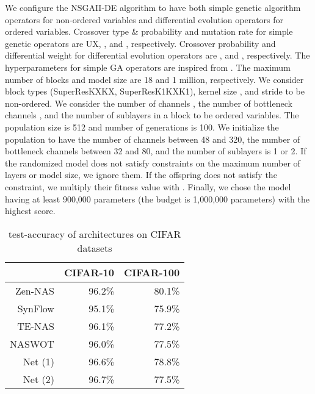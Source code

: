\documentclass[lettersize,journal]{IEEEtran}
\begin{document}
            We configure the NSGAII-DE algorithm to have both simple genetic algorithm operators for non-ordered variables and differential evolution operators for ordered variables. Crossover type \& probability and mutation rate for simple genetic operators are UX, , and , respectively. Crossover probability and differential weight for differential evolution operators are , and , respectively. The hyperparameters for simple GA operators are inspired from \cite{Genetic}. The maximum number of blocks and model size are 18 and 1 million, respectively. We consider block types (SuperResKXKX, SuperResK1KXK1), kernel size , and stride  to be non-ordered. We consider the number of channels , the number of bottleneck channels , and the number of sublayers in a block  to be ordered variables. The population size is 512 and number of generations is 100. We initialize the population to have the number of channels between 48 and 320, the number of bottleneck channels between 32 and 80, and the number of sublayers is 1 or 2. If the randomized model does not satisfy constraints on the maximum number of layers or model size, we ignore them. If the offspring does not satisfy the constraint, we multiply their fitness value with . Finally, we chose the model having at least 900,000 parameters (the budget is 1,000,000 parameters) with the highest score.

            \begin{table} 
                \caption{test-accuracy of architectures on CIFAR datasets}
                \label{tab:E2E}
                \centering
                \begin{tabular}{r|rr}
                \toprule
                    & CIFAR-10 & CIFAR-100\\
                    \midrule
                    Zen-NAS \cite{Zen-NAS} & 96.2\% & 80.1\% \\
                    SynFlow \cite{LightweightNAS} & 95.1\% & 75.9\% \\
                    TE-NAS \cite{TE-NAS} & 96.1\% & 77.2\% \\
                    NASWOT \cite{naswot} & 96.0\% & 77.5\%\\
                    Net (1) & 96.6\% & 78.8\% \\
                    Net (2) & 96.7\% & 77.5\% \\
                \bottomrule
            \end{tabular}
            \end{table}
\end{document}
